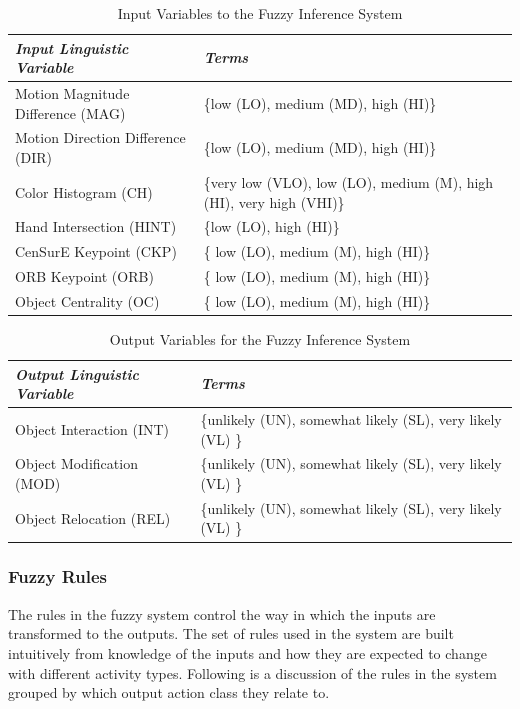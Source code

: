 \documentclass[12pt]{report}
\begin{document}
\begin{table}
\caption{Input Variables to the Fuzzy Inference System}

\begin{center}
\begin{tabular}{|p{}|p{}|}
\hline
\textbf{\textit{Input Linguistic Variable}}&\textbf{\textit{Terms}} \\
\hline
\hline
Motion Magnitude Difference (MAG) & \{low (LO), medium (MD), high (HI)\} \\
\hline
Motion Direction Difference (DIR) & \{low (LO), medium (MD), high (HI)\} \\
\hline
Color Histogram (CH) & \{very low (VLO), low (LO), medium (M), high (HI), very high (VHI)\} \\
\hline
Hand Intersection (HINT) & \{low (LO), high (HI)\} \\
\hline
CenSurE Keypoint (CKP) & \{ low (LO), medium (M), high (HI)\}  \\
\hline
ORB Keypoint (ORB) & \{ low (LO), medium (M), high (HI)\}  \\
\hline
Object Centrality (OC) & \{ low (LO), medium (M), high (HI)\} \\
\hline
\end{tabular}
\end{center}
\label{inputFeatures}
\end{table}


\begin{table}
\caption{Output Variables for the Fuzzy Inference System}

\begin{center}
\begin{tabular}{|p{}|p{}|}
\hline
\textbf{\textit{Output Linguistic Variable}}&\textbf{\textit{Terms}} \\
\hline
\hline
Object Interaction (INT) & \{unlikely (UN), somewhat likely (SL), very likely (VL) \} \\
\hline
Object Modification (MOD) & \{unlikely (UN), somewhat likely (SL), very likely (VL) \} \\
\hline
Object Relocation (REL) & \{unlikely (UN), somewhat likely (SL), very likely (VL) \} \\
\hline
\end{tabular}
\end{center}
\label{outputFeatures}
\end{table}


\subsubsection{Fuzzy Rules}
The rules in the fuzzy system control the way in which the inputs are transformed to the outputs. The set of rules used in the system are built intuitively from knowledge of the inputs and how they are expected to change with different activity types. Following is a discussion of the rules in the system grouped by which output action class they relate to.
\end{document}
